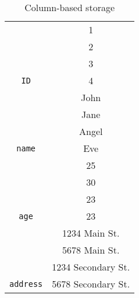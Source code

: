 \begin{table}[ht]
    \centering
    \begin{tabular}{|c|c|}
        \hline
        \cellcolor[HTML]{C0C0C0}                                   & 1                  \\ \cline{2-2}
        \cellcolor[HTML]{C0C0C0}                                   & 2                  \\ \cline{2-2}
        \cellcolor[HTML]{C0C0C0}                                   & 3                  \\ \cline{2-2}
        \multirow{-4}{*}{\cellcolor[HTML]{C0C0C0}\texttt{ID}}      & 4                  \\ \hline
        \cellcolor[HTML]{C0C0C0}                                   & John               \\ \cline{2-2}
        \cellcolor[HTML]{C0C0C0}                                   & Jane               \\ \cline{2-2}
        \cellcolor[HTML]{C0C0C0}                                   & Angel              \\ \cline{2-2}
        \multirow{-4}{*}{\cellcolor[HTML]{C0C0C0}\texttt{name}}    & Eve                \\ \hline
        \cellcolor[HTML]{C0C0C0}                                   & 25                 \\ \cline{2-2}
        \cellcolor[HTML]{C0C0C0}                                   & 30                 \\ \cline{2-2}
        \cellcolor[HTML]{C0C0C0}                                   & 23                 \\ \cline{2-2}
        \multirow{-4}{*}{\cellcolor[HTML]{C0C0C0}\texttt{age}}     & 23                 \\ \hline
        \cellcolor[HTML]{C0C0C0}                                   & 1234 Main St.      \\ \cline{2-2}
        \cellcolor[HTML]{C0C0C0}                                   & 5678 Main St.      \\ \cline{2-2}
        \cellcolor[HTML]{C0C0C0}                                   & 1234 Secondary St. \\ \cline{2-2}
        \multirow{-4}{*}{\cellcolor[HTML]{C0C0C0}\texttt{address}} & 5678 Secondary St. \\ \hline
    \end{tabular}
    \caption{Column-based storage}
\end{table}

